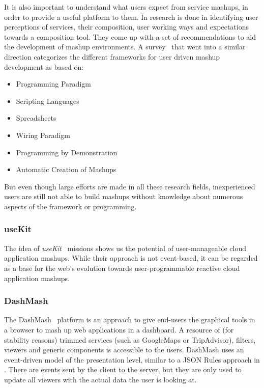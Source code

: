 \documentclass[11pt]{article}%
\begin{document}
It is also important to understand what users expect from service mashups, in order to provide a useful platform to them. In \cite{2010-Namoun_etal-EURCW.pdf} research is done in identifying user perceptions of services, their composition, user working ways and expectations towards a composition tool. They come up with a set of recommendations to aid the development of mashup environments. A survey~\cite{2009-Fischer_etal-OCAMG.pdf} that went into a similar direction categorizes the different frameworks for user driven mashup development as based on:\\
 \begin{itemize}
  \item Programming Paradigm
  \item Scripting Languages
  \item Spreadsheets
  \item Wiring Paradigm
  \item Programming by Demonstration
  \item Automatic Creation of Mashups
\end{itemize}
But even though large efforts are made in all these research fields, inexperienced users are still not able to build mashups without knowledge about numerous aspects of the framework or programming.

\subsubsection{useKit}
The idea of \emph{useKit}~\cite{2010-Rizzotti_Burkhart-useKit.pdf} missions shows us the potential of user-manageable cloud application mashups. While their approach is not event-based, it can be regarded as a base for the web's evolution towards user-programmable reactive cloud application mashups.

\subsubsection{DashMash}
The DashMash~\cite{2011-Cappiello_etal-DashMash.pdf} platform is an approach to give end-users the graphical tools in a browser to mash up web applications in a dashboard. A resource of (for stability reasons) trimmed services (such as GoogleMaps or TripAdvisor), filters, viewers and generic components is accessible to the users. DashMash uses an event-driven model of the presentation level, similar to a JSON Rules approach in \cite{2009-Pascalau_Giurca-RBACEM.pdf}. There are events sent by the client to the server, but they are only used to update all viewers with the actual data the user is looking at.
\end{document}
